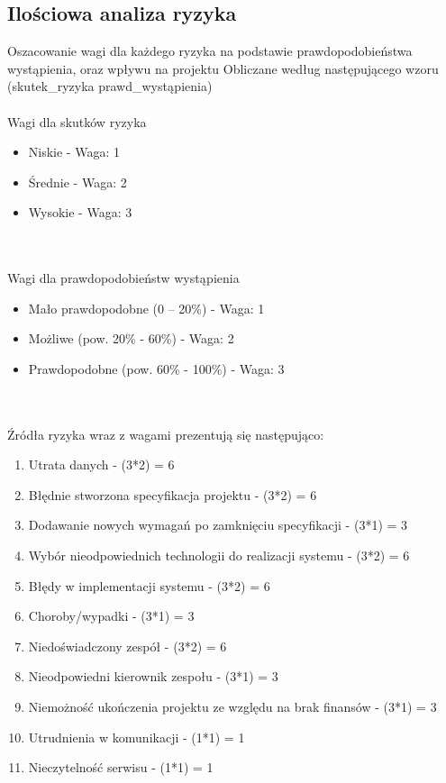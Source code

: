 \documentclass{article}
\begin{document}
\subsection{Ilościowa analiza ryzyka}
Oszacowanie wagi dla każdego ryzyka na podstawie prawdopodobieństwa wystąpienia, oraz wpływu na projektu
Obliczane według następującego wzoru (skutek\_ryzyka \* prawd\_wystąpienia)
\mbox{}\\\mbox{}\\
Wagi dla skutków ryzyka
\begin{itemize}
\item{Niskie     - Waga: 1}
\item{Średnie    - Waga: 2}
\item{Wysokie	 - Waga: 3}
\end{itemize}
\mbox{}\\
\mbox{}\\
Wagi dla prawdopodobieństw wystąpienia
\begin{itemize}
\item{Mało prawdopodobne (0 – 20\%) - Waga: 1}
\item{Możliwe (pow. 20\% - 60\%) - Waga: 2}
\item{Prawdopodobne (pow. 60\% - 100\%) - Waga: 3}
\end{itemize}
\mbox{}\\ \mbox{}\\
Źródła ryzyka wraz z wagami prezentują się następująco:
\begin{enumerate}
\item{Utrata danych - (3*2) = 6}
\item{Błędnie stworzona specyfikacja projektu - (3*2) = 6}
\item{Dodawanie nowych wymagań po zamknięciu specyfikacji - (3*1) = 3}
\item{Wybór nieodpowiednich technologii do realizacji systemu - (3*2) = 6}
\item{Błędy w implementacji systemu - (3*2) = 6}
\item{Choroby/wypadki - (3*1) = 3}
\item{Niedoświadczony zespół - (3*2) = 6}
\item{Nieodpowiedni kierownik zespołu - (3*1) = 3}
\item{Niemożność ukończenia projektu ze względu na brak finansów - (3*1) = 3}
\item{Utrudnienia w komunikacji - (1*1) = 1}
\item{Nieczytelność serwisu - (1*1) = 1}
\end{enumerate}
\newpage
\end{document}
